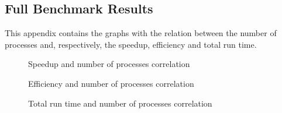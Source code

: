 \subsection{Full Benchmark Results}

This appendix contains the graphs with the relation between the number of processes and, respectively, the speedup, efficiency and total run time.

\begin{figure}[!ht]
    \centering
    
    
    
    
    \caption{Speedup and number of processes correlation}
    \label{fig:speedup}
\end{figure}

\begin{figure}[!ht]
    \centering
    
    
    
    
    \caption{Efficiency and number of processes correlation}
    \label{fig:efficiency}
\end{figure}

\begin{figure}[!ht]
    \centering
    
    
    
    
    \caption{Total run time and number of processes correlation}
\end{figure}
